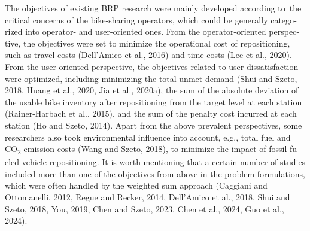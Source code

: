 \documentclass[
  english,
]{article}
\begin{document}
\begin{otherlanguage}{english}
\protect{}\label{p0105}
The objectives of existing BRP research were mainly developed according to~the critical concerns of
the bike-sharing operators, which could be generally categorized into operator- and user-oriented
ones. From the operator-oriented perspective, the objectives were set to minimize the operational
cost of repositioning, such as travel costs (Dell'Amico et al., 2016) and time costs (Lee et al.,
2020). From the user-oriented perspective, the objectives related to user dissatisfaction were
optimized, including minimizing the total unmet demand (Shui and Szeto, 2018, Huang et al., 2020,
Jia et al., 2020a), the sum of the absolute deviation of the usable bike inventory after
repositioning from the target level at each station (Rainer-Harbach et al., 2015), and the sum of
the penalty cost incurred at each station (Ho and Szeto, 2014). Apart from the above prevalent
perspectives, some researchers also took environmental influence into account, e.g., total fuel and
CO\textsubscript{2} emission costs (Wang and Szeto, 2018), to minimize the impact of fossil-fueled
vehicle repositioning. It is worth mentioning that a certain number of studies included more than
one of the objectives from above in the problem formulations, which were often handled by the
weighted sum approach (Caggiani and Ottomanelli, 2012, Regue and Recker, 2014, Dell'Amico et al.,
2018, Shui and Szeto, 2018, You, 2019, Chen and Szeto, 2023, Chen et al., 2024, Guo et al., 2024).


\end{otherlanguage}
\end{document}
